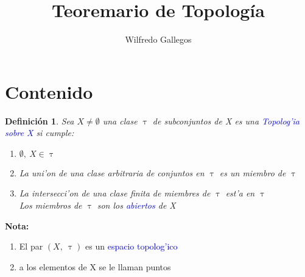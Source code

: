\documentclass{article}
\title{Teoremario de Topología}
\author{Wilfredo Gallegos}
\newtheorem{definition}{Definición}[section]
\begin{document}
\maketitle

\section{Contenido}
\begin{definition}
 	Sea $X\neq \emptyset$ una clase $\uptau$ de	subconjuntos de X es una \textcolor{blue}{Topolog'ia sobre X} si cumple:
 	\begin{enumerate}
 	\item $\emptyset,\ X\in \uptau$
 	\item  La uni'on de una clase arbitraria de conjuntos en $\uptau$ es un miembro de $\uptau$
 	\item La intersecci'on de una clase finita de miembres de $\uptau$ est'a en $\uptau$\\
 	Los miembros de $\uptau$ son los \textcolor{blue}{abiertos} de X 
	\end{enumerate}
\end{definition}
\textbf{Nota: } 
\begin{enumerate}
	\item El par $(X,\ \uptau)$ es un \textcolor{blue}{espacio topolog'ico} 
	\item a los elementos de X se le llaman puntos
\end{enumerate}
\end{document}
